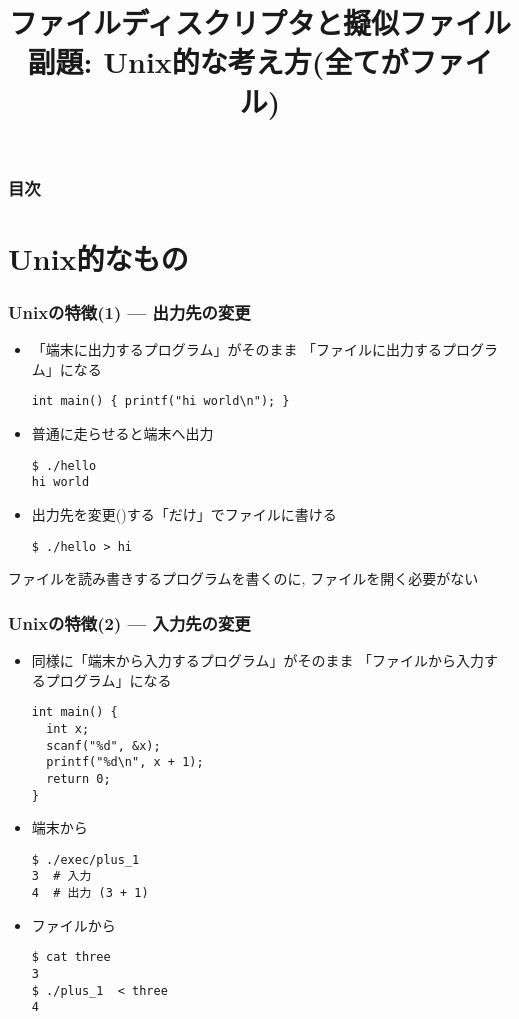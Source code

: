 \documentclass[12pt,dvipdfmx]{beamer}
\title{ファイルディスクリプタと擬似ファイル \\
副題: Unix的な考え方(全てがファイル)}
\begin{document}
\maketitle

\begin{frame}
\frametitle{目次}
\tableofcontents
\end{frame}

\section{Unix的なもの}

\begin{frame}[fragile]
  \frametitle{Unixの特徴(1) --- 出力先の変更}
  \begin{itemize}
  \item 「端末に出力するプログラム」がそのまま
    「ファイルに出力するプログラム」になる
\begin{lstlisting}
int main() { printf("hi world\n"); }
\end{lstlisting}
\item 普通に走らせると端末へ出力
\begin{lstlisting}
$ ./hello
hi world
\end{lstlisting} %

\item 出力先を変更()する「だけ」でファイルに書ける
\begin{lstlisting}
$ ./hello > hi
\end{lstlisting} %
  \end{itemize}

ファイルを読み書きするプログラムを書くのに,
ファイルを開く必要がない
\end{frame}

\begin{frame}[fragile]
  \frametitle{Unixの特徴(2) --- 入力先の変更}
  \begin{itemize}
  \item 同様に「端末から入力するプログラム」がそのまま
    「ファイルから入力するプログラム」になる
\begin{lstlisting}
int main() {
  int x;
  scanf("%d", &x);
  printf("%d\n", x + 1);
  return 0;
}
\end{lstlisting}
\item 端末から
\begin{lstlisting}
$ ./exec/plus_1 
3  # 入力
4  # 出力 (3 + 1)
\end{lstlisting} %
\item ファイルから
\begin{lstlisting}
$ cat three
3  
$ ./plus_1  < three
4
\end{lstlisting}
\end{itemize}
\end{frame}
\end{document}
